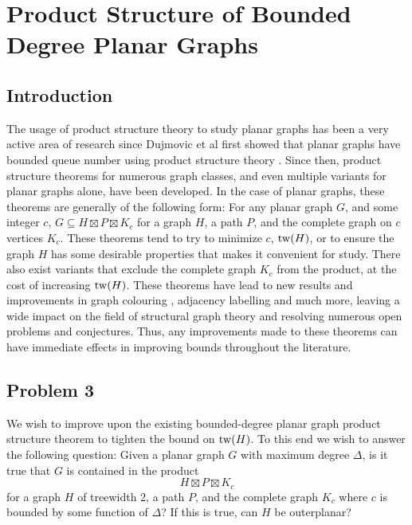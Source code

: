 \documentclass[../main.tex]{subfiles}
\begin{document}
	
	\section{Product Structure of Bounded Degree Planar Graphs}
	\subsection{Introduction}
	The usage of product structure theory to study planar graphs has been a very active area of research since Dujmovic et al first showed that planar graphs have bounded queue number using product structure theory \cite{DJMMUW20}. Since then, product structure theorems for numerous graph classes, and even multiple variants for planar graphs alone, have been developed. 
	In the case of planar graphs, these theorems are generally of the following form: For any planar graph $G$, and some integer $c$, $G\subseteq H \boxtimes P \boxtimes K_c$ for a graph $H$, a path $P$, and the complete graph on $c$ vertices $K_c$. These theorems tend to try to minimize $c$, $\operatorname{tw}(H)$, or to ensure the graph $H$ has some desirable properties that makes it convenient for study. There also exist variants that exclude the complete graph $K_c$ from the product, at the cost of increasing $\operatorname{tw}(H)$.
	These theorems have lead to new results and improvements in graph colouring \cite{DEJWW20}, adjacency labelling \cite{DEJGMM21,EJM23} and much more, leaving a wide impact on the field of structural graph theory and resolving numerous open problems and conjectures. Thus, any improvements made to these theorems can have immediate effects in improving bounds throughout the literature.
	
	\subsection{Problem 3}
	We wish to improve upon the existing bounded-degree planar graph product structure theorem to tighten the bound on $\operatorname{tw}(H)$. To this end we wish to answer the following question: Given a planar graph $G$ with maximum degree $\Delta$, is it true that $G$ is contained in the product $$H\boxtimes P\boxtimes K_c$$ for a graph $H$ of treewidth 2, a path $P$, and the complete graph $K_c$ where $c$ is bounded by some function of $\Delta$? If this is true, can $H$ be outerplanar? 
	
\end{document}
